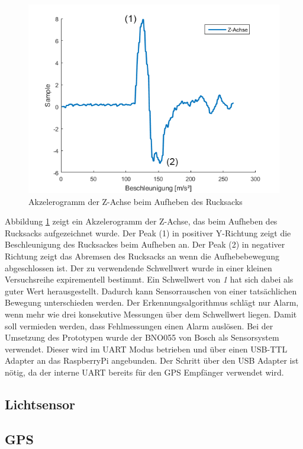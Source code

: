 \documentclass{sigchi}
\begin{document}
\begin{figure}
\centering
  \includegraphics[width=0.9\columnwidth]{fig/accel_z.png}
  \caption{Akzelerogramm der Z-Achse beim Aufheben des Rucksacks}
  \label{fig:accel_z}
\end{figure}

Abbildung \ref{fig:accel_z} zeigt ein Akzelerogramm der Z-Achse,
das beim Aufheben des Rucksacks aufgezeichnet wurde. Der Peak (1)
in positiver Y-Richtung zeigt die Beschleunigung des Rucksackes
beim Aufheben an. Der Peak (2) in negativer Richtung zeigt das
Abremsen des Rucksacks an wenn die Aufhebebewegung abgeschlossen
ist. Der zu verwendende Schwellwert wurde in einer kleinen
Versuchsreihe expirementell bestimmt. Ein Schwellwert von \textit{1}
hat sich dabei als guter Wert herausgestellt. Dadurch kann
Sensorrauschen von einer tatsächlichen Bewegung unterschieden
werden. Der Erkennungsalgorithmus schlägt nur Alarm, wenn mehr
wie drei konsekutive Messungen über dem Schwellwert liegen. Damit
soll vermieden werden, dass Fehlmessungen einen Alarm auslösen.
Bei der Umsetzung des Prototypen wurde der BNO055 \cite{Bosch:BNO055}
von Bosch als Sensorsystem verwendet. Dieser wird im UART Modus
betrieben und über einen USB-TTL Adapter an das RaspberryPi
angebunden. Der Schritt über den USB Adapter ist nötig, da der
interne UART bereits für den GPS Empfänger verwendet wird.

\subsection{Lichtsensor}

\subsection{GPS}
\end{document}
